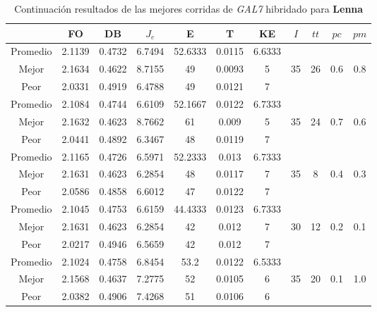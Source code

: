 \begin{table}[h!]
    \footnotesize
    \begin{center}
        \begin{tabular}{|c|c|c|c|c|c|c|c|c|c|c|}
        \hline
             & {\bf FO} & {\bf DB} & $J_e$ & {\bf E} & {\bf T} & {\bf KE} & $I$ & $tt$ & $pc$ & $pm$ \\
        \hline
        \hline
            Promedio  & 2.1139 & 0.4732 & 6.7494 & 52.6333 & 0.0115 & 6.6333 &  &  &  & \\
            \cline{1-7}
            Mejor & 2.1634 & 0.4622  & 8.7155 & 49 & 0.0093 & 5 & 35 & 26 & 0.6 & 0.8\\
            \cline{1-7}
            Peor & 2.0331 & 0.4919  & 6.4788 & 49 & 0.0121 & 7 &  &  &  & \\
        \hline
        \hline
            Promedio  & 2.1084 & 0.4744 & 6.6109 & 52.1667 & 0.0122 & 6.7333 &  &  &  & \\
            \cline{1-7}
            Mejor & 2.1632 & 0.4623  & 8.7662 & 61 & 0.009 & 5 & 35 & 24 & 0.7 & 0.6\\
            \cline{1-7}
            Peor & 2.0441 & 0.4892  & 6.3467 & 48 & 0.0119 & 7 &  &  &  & \\
        \hline
        \hline
            Promedio  & 2.1165 & 0.4726 & 6.5971 & 52.2333 & 0.013 & 6.7333 &  &  &  & \\
            \cline{1-7}
            Mejor & 2.1631 & 0.4623  & 6.2854 & 48 & 0.0117 & 7 & 35 & 8 & 0.4 & 0.3\\
            \cline{1-7}
            Peor & 2.0586 & 0.4858  & 6.6012 & 47 & 0.0122 & 7 &  &  &  & \\
        \hline
        \hline
            Promedio  & 2.1045 & 0.4753 & 6.6159 & 44.4333 & 0.0123 & 6.7333 &  &  &  & \\
            \cline{1-7}
            Mejor & 2.1631 & 0.4623  & 6.2854 & 42 & 0.012 & 7 & 30 & 12 & 0.2 & 0.1\\
            \cline{1-7}
            Peor & 2.0217 & 0.4946  & 6.5659 & 42 & 0.012 & 7 &  &  &  & \\
        \hline
        \hline
            Promedio  & 2.1024 & 0.4758 & 6.8454 & 53.2 & 0.0122 & 6.5333 &  &  &  & \\
            \cline{1-7}
            Mejor & 2.1568 & 0.4637  & 7.2775 & 52 & 0.0105 & 6 & 35 & 20 & 0.1 & 1.0\\
            \cline{1-7}
            Peor & 2.0382 & 0.4906  & 7.4268 & 51 & 0.0106 & 6 &  &  &  & \\
        \hline
        \end{tabular}
        \caption{Continuaci\'on resultados de las mejores corridas de \emph{GAL7} hibridado para {\bf Lenna}}
        \label{tb:tablecGAL7}
    \end{center}
\end{table}
